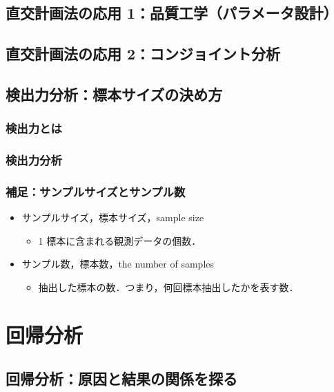 \section{直交計画法の応用 1：品質工学（パラメータ設計）}
\section{直交計画法の応用 2：コンジョイント分析}

\section{検出力分析：標本サイズの決め方}
\subsection{検出力とは}
\subsection{検出力分析}

\subsection{補足：サンプルサイズとサンプル数}

\begin{itemize}
  \item サンプルサイズ，標本サイズ，sample size
        \begin{itemize}
          \item 1 標本に含まれる観測データの個数．
        \end{itemize}
  \item サンプル数，標本数，the number of samples
        \begin{itemize}
          \item 抽出した標本の数．つまり，何回標本抽出したかを表す数．
        \end{itemize}
\end{itemize}


\chapter{回帰分析}

\section{回帰分析：原因と結果の関係を探る}
